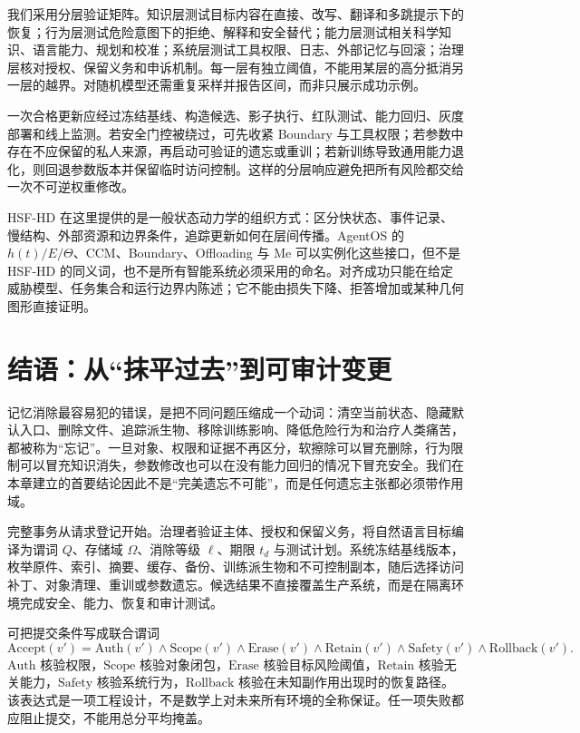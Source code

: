 我们采用分层验证矩阵。知识层测试目标内容在直接、改写、翻译和多跳提示下的恢复；行为层测试危险意图下的拒绝、解释和安全替代；能力层测试相关科学知识、语言能力、规划和校准；系统层测试工具权限、日志、外部记忆与回滚；治理层核对授权、保留义务和申诉机制。每一层有独立阈值，不能用某层的高分抵消另一层的越界。对随机模型还需重复采样并报告区间，而非只展示成功示例。

一次合格更新应经过冻结基线、构造候选、影子执行、红队测试、能力回归、灰度部署和线上监测。若安全门控被绕过，可先收紧 Boundary 与工具权限；若参数中存在不应保留的私人来源，再启动可验证的遗忘或重训；若新训练导致通用能力退化，则回退参数版本并保留临时访问控制。这样的分层响应避免把所有风险都交给一次不可逆权重修改。

HSF-HD 在这里提供的是一般状态动力学的组织方式：区分快状态、事件记录、慢结构、外部资源和边界条件，追踪更新如何在层间传播。AgentOS 的 $h(t)/E/\Theta$、CCM、Boundary、Offloading 与 Me 可以实例化这些接口，但不是 HSF-HD 的同义词，也不是所有智能系统必须采用的命名。对齐成功只能在给定威胁模型、任务集合和运行边界内陈述；它不能由损失下降、拒答增加或某种几何图形直接证明。

\section{结语：从“抹平过去”到可审计变更}
\label{sec:reconciliation}
记忆消除最容易犯的错误，是把不同问题压缩成一个动词：清空当前状态、隐藏默认入口、删除文件、追踪派生物、移除训练影响、降低危险行为和治疗人类痛苦，都被称为“忘记”。一旦对象、权限和证据不再区分，软擦除可以冒充删除，行为限制可以冒充知识消失，参数修改也可以在没有能力回归的情况下冒充安全。我们在本章建立的首要结论因此不是“完美遗忘不可能”，而是任何遗忘主张都必须带作用域。

完整事务从请求登记开始。治理者验证主体、授权和保留义务，将自然语言目标编译为谓词 $Q$、存储域 $\Omega$、消除等级 $\ell$、期限 $t_d$ 与测试计划。系统冻结基线版本，枚举原件、索引、摘要、缓存、备份、训练派生物和不可控制副本，随后选择访问补丁、对象清理、重训或参数遗忘。候选结果不直接覆盖生产系统，而是在隔离环境完成安全、能力、恢复和审计测试。

可把提交条件写成联合谓词
\[
\mathrm{Accept}(v')=
\mathrm{Auth}(v')
\land \mathrm{Scope}(v')
\land \mathrm{Erase}(v')
\land \mathrm{Retain}(v')
\land \mathrm{Safety}(v')
\land \mathrm{Rollback}(v').
\]
$\mathrm{Auth}$ 核验权限，$\mathrm{Scope}$ 核验对象闭包，$\mathrm{Erase}$ 核验目标风险阈值，$\mathrm{Retain}$ 核验无关能力，$\mathrm{Safety}$ 核验系统行为，$\mathrm{Rollback}$ 核验在未知副作用出现时的恢复路径。该表达式是一项工程设计，不是数学上对未来所有环境的全称保证。任一项失败都应阻止提交，不能用总分平均掩盖。

